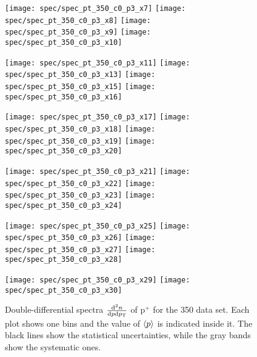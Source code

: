 \begin{figure}[!ht]
  \centering

  \texttt{[image: spec/spec\_pt\_350\_c0\_p3\_x7]}
  \texttt{[image: spec/spec\_pt\_350\_c0\_p3\_x8]}
  \texttt{[image: spec/spec\_pt\_350\_c0\_p3\_x9]}
  \texttt{[image: spec/spec\_pt\_350\_c0\_p3\_x10]}

  \texttt{[image: spec/spec\_pt\_350\_c0\_p3\_x11]}
  \texttt{[image: spec/spec\_pt\_350\_c0\_p3\_x13]}
  \texttt{[image: spec/spec\_pt\_350\_c0\_p3\_x15]}
  \texttt{[image: spec/spec\_pt\_350\_c0\_p3\_x16]}

  \texttt{[image: spec/spec\_pt\_350\_c0\_p3\_x17]}
  \texttt{[image: spec/spec\_pt\_350\_c0\_p3\_x18]}
  \texttt{[image: spec/spec\_pt\_350\_c0\_p3\_x19]}
  \texttt{[image: spec/spec\_pt\_350\_c0\_p3\_x20]}

  \texttt{[image: spec/spec\_pt\_350\_c0\_p3\_x21]}
  \texttt{[image: spec/spec\_pt\_350\_c0\_p3\_x22]}
  \texttt{[image: spec/spec\_pt\_350\_c0\_p3\_x23]}
  \texttt{[image: spec/spec\_pt\_350\_c0\_p3\_x24]}

  \texttt{[image: spec/spec\_pt\_350\_c0\_p3\_x25]}
  \texttt{[image: spec/spec\_pt\_350\_c0\_p3\_x26]}
  \texttt{[image: spec/spec\_pt\_350\_c0\_p3\_x27]}
  \texttt{[image: spec/spec\_pt\_350\_c0\_p3\_x28]}

  \texttt{[image: spec/spec\_pt\_350\_c0\_p3\_x29]}
  \texttt{[image: spec/spec\_pt\_350\_c0\_p3\_x30]}
 
  \caption{Double-differential spectra $\frac{\text{d}^2n}{\text{d}p\text{d}p_\text{T}}$
    of p$^+$ for the 350 \GeVc data set. Each plot shows one \pp bins and the value
    of $\langle p\rangle$ is indicated inside it. The black lines show the statistical
    uncertainties, while the gray bands show the systematic ones.}
  \label{fig:hadron:spec:dedx:all350:c0p3}
\end{figure}

